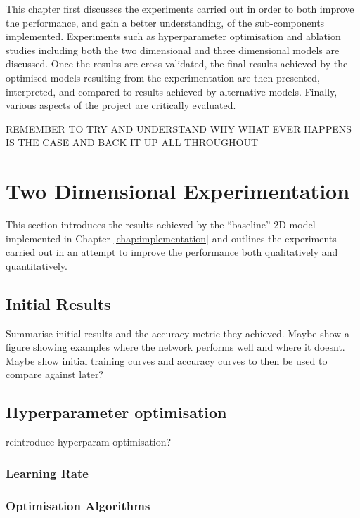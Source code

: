 This chapter first discusses the experiments carried out in order to both improve the performance, and gain a better understanding, of the sub-components implemented. Experiments such as hyperparameter optimisation and ablation studies including both the two dimensional and three dimensional models are discussed. Once the results are cross-validated, the final results achieved by the optimised models resulting from the experimentation are then presented, interpreted, and compared to results achieved by alternative models. Finally, various aspects of the project are critically evaluated.

REMEMBER TO TRY AND UNDERSTAND WHY WHAT EVER HAPPENS IS THE CASE AND BACK IT UP ALL THROUGHOUT

\section{Two Dimensional Experimentation}

This section introduces the results achieved by the ``baseline'' 2D model implemented in Chapter \ref{chap:implementation} and outlines the experiments carried out in an attempt to improve the performance both qualitatively and quantitatively.

\subsection{Initial Results}

Summarise initial results and the accuracy metric they achieved. Maybe show a figure showing examples where the network performs well and where it doesnt. Maybe show initial training curves and accuracy curves to then be used to compare against later?

\subsection{Hyperparameter optimisation}

reintroduce hyperparam optimisation?

\subsubsection{Learning Rate}

\subsubsection{Optimisation Algorithms}

